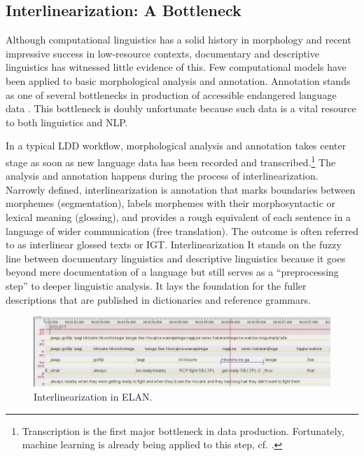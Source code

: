 \documentclass[12pt]{article}
\begin{document}

\subsection{Interlinearization: A Bottleneck}

Although computational linguistics has a solid history in morphology and recent impressive success in low-resource contexts, documentary and descriptive linguistics has witnessed little evidence of this. Few computational models have been applied to basic morphological analysis and annotation. Annotation stands as one of several bottlenecks in production of accessible endangered language data \cite{holton_developing_2017}. This bottleneck is doubly unfortunate because such data is a vital resource to both linguistics and NLP.

In a typical LDD workflow, morphological analysis and annotation takes center stage as soon as new language data has been recorded and transcribed.\footnote{Transcription is the first major bottleneck in data production. Fortunately, machine learning is already being applied to this step, cf. \cite{foley_elpis_2018}.} The analysis and annotation happens during the process of interlinearization. Narrowly defined, interlinearization is annotation that marks boundaries between morphemes (segmentation), labels morphemes with their morphosyntactic or lexical meaning (glossing), and provides a rough equivalent of each sentence in a language of wider communication (free translation). The outcome is often referred to as interlinear glossed texts or IGT. Interlinearization It stands on the fuzzy line between documentary linguistics and descriptive linguistics because it goes beyond mere documentation of a language but still serves as a ``preprocessing step'' \cite{moon_unsupervised_2009} to deeper linguistic analysis. It lays the foundation for the fuller descriptions that are published in dictionaries and reference grammars. 

\begin{figure}
\label{fig:ELAN}
\begin{center}
\includegraphics[width=0.75\columnwidth]{ELAN.png}
\caption{Interlinearization in ELAN.}
\end{center}
\end{figure}
\end{document}
